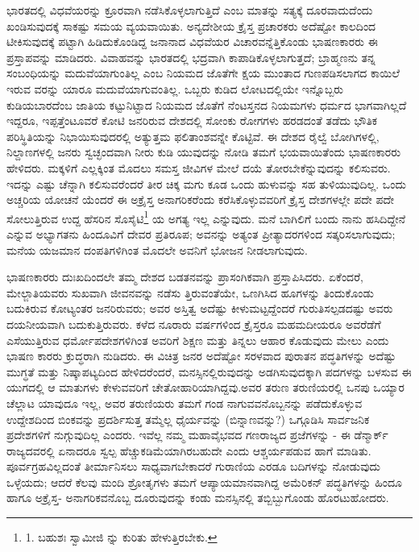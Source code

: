 ಭಾರತದಲ್ಲಿ ವಿಧವೆಯರನ್ನು ಕ್ರೂರವಾಗಿ ನಡೆಸಿಕೊಳ್ಳಲಾಗುತ್ತಿದೆ ಎಂಬ ಮಾತನ್ನು ಸತ್ಯಕ್ಕೆ ದೂರವಾದುದೆಂದು ಖಂಡಿಸುವುದಕ್ಕೆ ಸಾಕಷ್ಟು ಸಮಯ ವ್ಯಯವಾಯಿತು. ಅನ್ಯದೇಶೀಯ ಕ್ರೈಸ್ತ ಪ್ರಚಾರಕರು ಅದೆಷ್ಟೋ ಕಾಲದಿಂದ ಟೀಕಿಸುವುದಕ್ಕೆ ಪಟ್ಟಾಗಿ ಹಿಡಿದುಕೊಂಡಿದ್ದ ಜನಾನಾದ ವಿಧವೆಯರ ವಿಚಾರವನ್ನೆತ್ತಿಕೊಂಡು ಭಾಷಣಕಾರರು ಈ ಪ್ರಸ್ತಾಪವನ್ನು ಮಾಡಿದರು. ವಿವಾಹವನ್ನು ಭಾರತದಲ್ಲಿ ಭದ್ರವಾಗಿ ಕಾಪಾಡಿಕೊಳ್ಳಲಾಗುತ್ತದೆ; ಬ್ರಾಹ್ಮಣನು ತನ್ನ ಸಂಬಂಧಿಯನ್ನು ಮದುವೆಯಾಗುಂತಿಲ್ಲ ಎಂಬ ನಿಯಮದ ಜೊತೆಗೇ ಕ್ಷಯ ಮುಂತಾದ ಗುಣಪಡಿಸಲಾಗದ ಕಾಯಿಲೆ ಇರುವ ವರನ್ನು ಯಾರೂ ಮದುವೆಯಾಗುವಂತಿಲ್ಲ. ಒಬ್ಬರು ಕುಡಿದ ಲೋಟದಲ್ಲಿಯೇ ಇನ್ನೊಬ್ಬರು ಕುಡಿಯಬಾರದೆಂಬ ಜಾತಿಯ ಕಟ್ಟುನಿಟ್ಟಾದ ನಿಯಮದ ಜೊತೆಗೆ ನೆಂಟಸ್ತನದ ನಿಯಮಗಳು ಧರ್ಮದ ಭಾಗವಾಗಿಲ್ಲದೆ ಇದ್ದರೂ, ಇಪ್ಪತ್ತೆಂಟೂವರೆ ಕೋಟಿ ಜನರಿರುವ ದೇಶದಲ್ಲಿ ಸೋಂಕು ರೋಗಗಳು ಹರಡದಂತೆ ತಡೆದು ಭೌತಿಕ ಪರಿಸ್ಥಿತಿಯನ್ನು ನಿಭಾಯಿಸುವುದರಲ್ಲಿ ಅತ್ಯುತ್ತಮ ಫಲಿತಾಂಶವನ್ನೇ ಕೊಟ್ಟಿವೆ. ಈ ದೇಶದ ರೈಲ್ವೆ ಬೋಗಿಗಳಲ್ಲಿ, ನಿಲ್ದಾಣಗಳಲ್ಲಿ ಜನರು ಸ್ವಚ್ಛಂದವಾಗಿ ನೀರು ಕುಡಿ ಯುವುದನ್ನು ನೋಡಿ ತಮಗೆ ಭಯವಾಯಿತೆಂದು ಭಾಷಣಕಾರರು ಹೇಳಿದರು. ಮಕ್ಕಳಿಗೆ ಎಲ್ಲಕ್ಕಿಂತ ಮೊದಲು ಸಮಸ್ತ ಜೀವಿಗಳ ಮೇಲೆ ದಯೆ ತೋರಬೇಕೆನ್ನುವುದನ್ನು ಕಲಿಸುವರು. ಇದನ್ನು ಎಷ್ಟು ಚೆನ್ನಾಗಿ ಕಲಿಸುವರೆಂದರೆ ತೀರ ಚಿಕ್ಕ ಮಗು ಕೂಡ ಒಂದು ಹುಳುವನ್ನು ಸಹ ತುಳಿಯುವುದಿಲ್ಲ. ಒಂದು ಅಚ್ಚರಿಯ ಯೋಚನೆ ಯೆಂದರೆ ಈ ಅಕ್ರೈಸ್ತ ಅನಾಗರಿಕರೆಂದು ಕರೆಸಿಕೊಳ್ಳುವವರಿಗೆ ಕ್ರೈಸ್ತ ದೇಶಗಳಲ್ಲೇ ಪದೇ ಪದೇ ಸೋಲುತ್ತಿರುವ ಉದ್ದ ಹೆಸರಿನ ಸೊಸೈಟಿ\footnote{1. ಬಹುಶಃ ಸ್ವಾಮೀಜಿ  ನ್ನು ಕುರಿತು ಹೇಳುತ್ತಿರಬೇಕು.} ಯ ಅಗತ್ಯ ಇಲ್ಲ ಎನ್ನುವುದು. ಮನೆ ಬಾಗಿಲಿಗೆ ಬಂದು ನಾನು ಹಸಿದಿದ್ದೇನೆ ಎನ್ನುವ ಅಭ್ಯಾಗತನು ಹಿಂದೂವಿಗೆ ದೇವರ ಪ್ರತಿರೂಪ; ಅವನನ್ನು ಅತ್ಯಂತ ಪ್ರೀತ್ಯಾದರಗಳಿಂದ ಸತ್ಕರಿಸಲಾಗುವುದು; ಮನೆಯ ಯಜಮಾನ ದಂಪತಿಗಳಿಗಿಂತ ಮೊದಲೇ ಅವನಿಗೆ ಭೋಜನ ನೀಡಲಾಗುವುದು.

ಭಾಷಣಕಾರರು ದುಃಖದಿಂದಲೇ ತಮ್ಮ ದೇಶದ ಬಡತನವನ್ನು ಪ್ರಾಸಂಗಿಕವಾಗಿ ಪ್ರಸ್ತಾಪಿಸಿದರು. ಏಕೆಂದರೆ, ಮೇಲ್ಜಾತಿಯವರು ಸುಖವಾಗಿ ಜೀವನವನ್ನು ನಡೆಸು ತ್ತಿರುವಂತೆಯೇ, ಒಣಗಿಸಿದ ಹೂಗಳನ್ನು ತಿಂದುಕೊಂಡು ಬದುಕಿರುವ ಕೋಟ್ಯಂತರ ಜನರಿರುವರು; ಅವರ ಅಸ್ತಿತ್ವ ಅದೆಷ್ಟು ಕೀಳುಮಟ್ಟದ್ದೆಂದರೆ ಗುರುತಿಸಲ್ಪಡದಷ್ಟು ಅವರು ದಯನೀಯವಾಗಿ ಬದುಕುತ್ತಿರುವರು. ಕಳೆದ ನೂರಾರು ವರ್ಷಗಳಿಂದ ಕ್ರೈಸ್ತರೂ ಮಹಮದೀಯರೂ ಅವರೆಡೆಗೆ ಎಸೆಯುತ್ತಿರುವ ಧರ್ಮೋಪದೇಶಗಳಿಗಿಂತ ಅವರಿಗೆ ಶಿಕ್ಷಣ ಮತ್ತು ತಿನ್ನಲು ಆಹಾರ ಕೊಡುವುದು ಮೇಲು ಎಂದು ಭಾಷಣ ಕಾರರು ಕ್ರುದ್ಧರಾಗಿ ನುಡಿದರು. ಈ ವಿಚಿತ್ರ ಜನರ ಅದೆಷ್ಟೋ ಸರಳವಾದ ಪುರಾತನ ಪದ್ಧತಿಗಳನ್ನು ಅದೆಷ್ಟು ಮುಗ್ಧತೆ ಮತ್ತು ನಿಷ್ಕಾಪಟ್ಯದಿಂದ ಹೇಳಿದರೆಂದರೆ, ಮನಸ್ಸಿನಲ್ಲಿರುವುದನ್ನು ಅಡಗಿಸುವುದಕ್ಕಾಗಿ ಪದಗಳನ್ನು ಬಳಸುವ ಈ ಯುಗದಲ್ಲಿ ಆ ಮಾತುಗಳು ಕೇಳುವವರಿಗೆ ಚೇತೋಹಾರಿಯಾಗಿದ್ದವು.ಅವರ ತರುಣ ತರುಣಿಯರಲ್ಲಿ ಒನಪು ಒಯ್ಯಾರ ಚೆಲ್ಲಾಟ ಯಾವುದೂ ಇಲ್ಲ, ಅವರ ತರುಣಿಯರು ತಮಗೆ ಗಂಡ ನಾಗುವವನೊಬ್ಬನನ್ನು ಪಡೆದುಕೊಳ್ಳುವ ಉದ್ದೇಶದಿಂದ ಬಿಂಕವನ್ನು ಪ್ರದರ್ಶಿಸುತ್ತ ತಮ್ಮೆಲ್ಲ ಧೈರ್ಯವನ್ನು (ಬಿನ್ನಾಣವನ್ನು?) ಒಗ್ಗೂಡಿಸಿ ಸಾರ್ವಜನಿಕ ಪ್ರದೇಶಗಳಿಗೆ ನುಗ್ಗುವುದಿಲ್ಲ ಎಂದರು. ಇವೆಲ್ಲ ನಮ್ಮ ಮಹಾವೈಭವದ ಗಣರಾಜ್ಯದ ಪ್ರಜೆಗಳನ್ನು - ಈ ಡೆನ್ಮಾರ್ಕ್ ರಾಜ್ಯದವರಲ್ಲಿ ಏನಾದರೂ ಸ್ವಲ್ಪ ಹೆಚ್ಚುಕಡಿಮೆಯಾಗಿರಬಹುದೇ ಎಂದು ಆಶ್ಚರ್ಯಪಡುವ ಹಾಗೆ ಮಾಡಿತು. ಪೂರ್ವಗ್ರಹವಿಲ್ಲದಂತೆ ತೀರ್ಮಾನಿಸಲು ಸಾಧ್ಯವಾಗಬೇಕಾದರೆ ಗುರಾಣಿಯ ಎರಡೂ ಬದಿಗಳನ್ನು ನೋಡುವುದು ಒಳ್ಳೆಯದು; ಆದರೆ ಕೆಲವು ಮಂದಿ ಶ್ರೋತೃಗಳು ತಮಗೆ ಆಪ್ಯಾಯಮಾನವಾಗಿದ್ದ ಅಮೆರಿಕನ್ ಪದ್ಧತಿಗಳನ್ನು ಹಿಂದೂ ಹಾಗೂ ಅಕ್ರೈಸ್ತ- ಅನಾಗರಿಕವನೊಬ್ಬ ದೂರುವುದನ್ನು ಕಂಡು ಮನಸ್ಸಿನಲ್ಲಿ ತಬ್ಬಿಬ್ಬುಗೊಂಡು ಹೊರಟುಹೋದರು.

